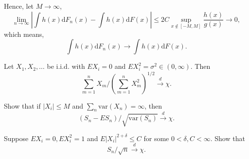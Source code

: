 \begin{solution}
    Hence, let $M\rightarrow\infty$,
    \begin{equation*}
        \lim_{n\rightarrow\infty}\left|\int h(x)\mathrm{d}F_{n}(x)-\int h(x)\mathrm{d}F(x)\right| \leq 2C\sup_{x\notin[-M,M]}\frac{h(x)}{g(x)}\rightarrow 0,
    \end{equation*}
    which means,
    \begin{equation*}
        \int h(x)\mathrm{d}F_{n}(x) \rightarrow \int h(x)\mathrm{d}F(x).
    \end{equation*}
\end{solution}

\begin{exercise}
    Let $X_{1},X_{2},\ldots$ be i.i.d. with $EX_{i}=0$ and $EX_{i}^{2}=\sigma^{2}\in(0,\infty)$. Then
    \begin{equation*}
        \sum_{m=1}^{n}X_{m}/\left(\sum_{m=1}^{n}X_{m}^{2}\right)^{1/2}\stackrel{d}{\rightarrow}\chi.
    \end{equation*}
\end{exercise}

\begin{exercise}
    Show that if $\left|X_{i}\right|\leq M$ and $\sum_{n}\text{var}\left(X_{n}\right)=\infty$, then
    \begin{equation*}
        \left(S_{n}-E S_{n}\right)/\sqrt{\text{var}\left(S_{n}\right)}\stackrel{d}{\rightarrow}\chi.
    \end{equation*}
\end{exercise}

\begin{exercise}
    Suppose $EX_{i}=0,EX_{i}^{2}=1$ and $E\left|X_{i}\right|^{2+\delta}\leq C$ for some $0<\delta,C<\infty$. Show that
    \begin{equation*}
        S_{n}/\sqrt{n}\stackrel{d}{\rightarrow}\chi.
    \end{equation*}
\end{exercise}